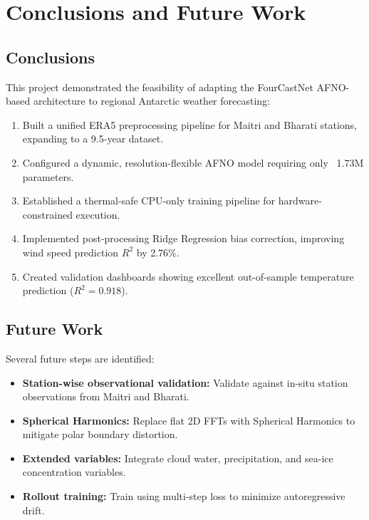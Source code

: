 \documentclass[12pt,titlepage,a4paper]{report}
\begin{document}
\chapter{Conclusions and Future Work}
\section{Conclusions}
This project demonstrated the feasibility of adapting the FourCastNet AFNO-based architecture to regional Antarctic weather forecasting:
\begin{enumerate}
    \item Built a unified ERA5 preprocessing pipeline for Maitri and Bharati stations, expanding to a 9.5-year dataset.
    \item Configured a dynamic, resolution-flexible AFNO model requiring only ~1.73M parameters.
    \item Established a thermal-safe CPU-only training pipeline for hardware-constrained execution.
    \item Implemented post-processing Ridge Regression bias correction, improving wind speed prediction $R^2$ by 2.76\%.
    \item Created validation dashboards showing excellent out-of-sample temperature prediction ($R^2 = 0.918$).
\end{enumerate}

\section{Future Work}
Several future steps are identified:
\begin{itemize}
    \item \textbf{Station-wise observational validation:} Validate against in-situ station observations from Maitri and Bharati.
    \item \textbf{Spherical Harmonics:} Replace flat 2D FFTs with Spherical Harmonics to mitigate polar boundary distortion.
    \item \textbf{Extended variables:} Integrate cloud water, precipitation, and sea-ice concentration variables.
    \item \textbf{Rollout training:} Train using multi-step loss to minimize autoregressive drift.
\end{itemize}

\end{document}
